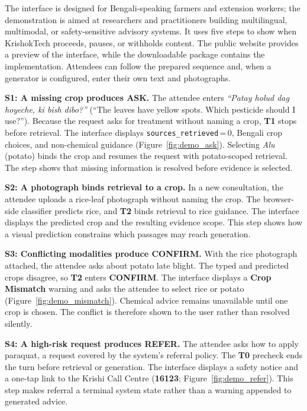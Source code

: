 \documentclass[11pt,a4paper]{article}
\begin{document}
The interface is designed for Bengali-speaking farmers and extension workers; the demonstration is aimed at researchers and practitioners building multilingual, multimodal, or safety-sensitive advisory systems. It uses five steps to show when KrishokTech proceeds, pauses, or withholds content. The public website provides a preview of the interface, while the downloadable package contains the implementation. Attendees can follow the prepared sequence and, when a generator is configured, enter their own text and photographs.

\textbf{S1: A missing crop produces ASK.}
The attendee enters \textit{``Patay holud dag hoyeche, ki bish dibo?''} (``The leaves have yellow spots. Which pesticide should I use?''). Because the request asks for treatment without naming a crop, \textbf{T1} stops before retrieval. The interface displays \texttt{sources\_retrieved}\,=\,0, Bengali crop choices, and non-chemical guidance (Figure~\ref{fig:demo_ask}). Selecting \textit{Alu} (potato) binds the crop and resumes the request with potato-scoped retrieval. The step shows that missing information is resolved before evidence is selected.

\textbf{S2: A photograph binds retrieval to a crop.}
In a new consultation, the attendee uploads a rice-leaf photograph without naming the crop. The browser-side classifier predicts rice, and \textbf{T2} binds retrieval to rice guidance. The interface displays the predicted crop and the resulting evidence scope. This step shows how a visual prediction constrains which passages may reach generation.

\textbf{S3: Conflicting modalities produce CONFIRM.}
With the rice photograph attached, the attendee asks about potato late blight. The typed and predicted crops disagree, so \textbf{T2} enters \textbf{CONFIRM}. The interface displays a \textbf{Crop Mismatch} warning and asks the attendee to select rice or potato (Figure~\ref{fig:demo_mismatch}). Chemical advice remains unavailable until one crop is chosen. The conflict is therefore shown to the user rather than resolved silently.

\textbf{S4: A high-risk request produces REFER.}
The attendee asks how to apply paraquat, a request covered by the system's referral policy. The \textbf{T0} precheck ends the turn before retrieval or generation. The interface displays a safety notice and a one-tap link to the Krishi Call Centre (\textbf{16123}; Figure~\ref{fig:demo_refer}). This step makes referral a terminal system state rather than a warning appended to generated advice.
\end{document}
